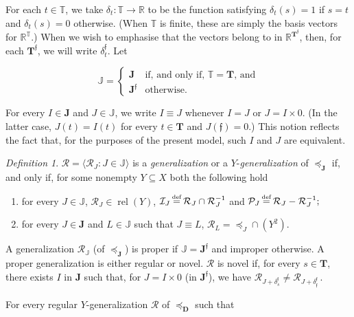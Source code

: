 \documentclass[ecta,nameyear,draft]{econsocart}
\newcommand{\bs}{-}%
\newcommand{\R}{\mathbb R}
\newcommand{\mc}{\mathcal}
\newcommand\defeq{\mathrel{\overset{\makebox[0pt]{\mbox{\normalfont\tiny def}}}{=}}}%
\newcommand{\relations}{\operatorname{rel}}
\newcommand{\novel}{\mathfrak f}
\newcommand{\preceqb}{\mathbin{\preceq}}
\newcommand{\ext}{\mathrel{\mc R}}
\newcommand{\extb}{\mathbin{\mc R}}
\newcommand{\sextb}{\mathbin{\mc P}}
\newcommand{\nextb}{\mathbin{\mc I}}
\newcommand{\mbbd}{{\mathbf D}}
\newcommand{\mbbt}{{\mathbf {T}}}
\newcommand{\mbbtp}{{\mathbf{T}^\novel}}
\newcommand{\mbbtpp}{{\mathds{T}}}
\newcommand{\mbbj}{\mathbf J}
\newcommand{\mbbjp}{{\mathbf {J}^{\novel}}}
\newcommand{\mbbjpp}{\mathds{J}}
\theoremstyle{plain}
\theoremstyle{remark}
\newtheorem{definition}{Definition}%
\begin{document}
\begin{appendix}
  For each $t \in \mbbtpp$, we take $\delta_{t} : \mbbtpp \rightarrow \R$ to be
  the function satisfying $\delta_{t} ( s ) = 1$ if $s = t$ and $\delta_{t} (s)
  = 0$ otherwise. (When $\mbbtpp$ is finite, these are simply the basis vectors
  for $\R^{\mbbtpp}$.)  When we wish to emphasise that the vectors belong to in
  $\R^{\mbbtp}$, then, for each $\mbbtp$, we will write $\delta_{t}^{\novel}$.
  Let
  \begin{linenomath*}
    \begin{equation*}
      \text{$\mbbjpp$} = \left \{
        \begin{array}{ll}
          \mbbj & \text{if, and only if, $\mbbtpp = \mbbt$, and} \\
          \mbbjp & \text{otherwise.}
      \end{array}\right.
    \end{equation*}
  \end{linenomath*}
  For every $I \in \mbbj$ and $J \in \mbbjpp$, we write $I \equiv J$ whenever
  $I
  = J$ or $J = I\times 0$. (In the latter case, $J(t)= I(t)$ for every $t\in
  \mbbt$ and $J(\novel )= 0$.) This notion reflects the fact that, for the
  purposes of the present model, such $I$ and $J$ are equivalent.
  \begin{definition}\label{def-generalizationQ} $\extb =\langle \extb_{J}: J
    \in \mbbjpp \rangle$ is a \emph{generalization} or a
    $Y$-\emph{generalization} of $\preceqb _{\mbbj}$ if, and only if, for
    some nonempty $Y \subseteq X$ both the following hold
    \begin{enumerate}
      \item for every $J\in \mbbjpp$, $\extb_{J}\in \relations(Y)$, $\nextb_{J}
        \defeq \extb_{J} \cap \extb_{J}^{-1}$ and $\sextb_{J} \defeq \extb_{J}
        \bs \extb_{J}^{-1};$
      \item for every $J \in \mbbj$ and $L \in \mbbjpp$ such that $J \equiv L$,
        $\extb_{L} = \preceqb_{J} \cap (Y^2)$. \label{item-preservingQ}
    \end{enumerate}
    A generalization $\ext_{\mbbjpp}$ (of $\preceq_{\mbbj}$) is proper if
    $\mbbjpp= \mbbjp$ and improper otherwise.  A proper generalization is
    either regular or novel. $\ext$ is novel if, for every $s \in \mbbt$, there
    exists $I$ in $\mbbj$ such that, for $J = I \times 0$ (in $\mbbjp$), we
    have $\extb _ {J + \delta _{s}^{\novel}} \neq \extb _ {J + \delta _
    {\novel}^{\novel} }$\,.
  \end{definition} 
  For every regular $Y$-generalization $\ext$ of $\preceq_{\mbbd}$ such that

\end{appendix}
\end{document}
